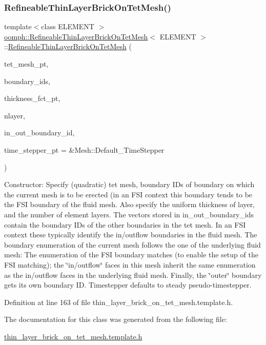 \subsubsection{\texorpdfstring{Refineable\+Thin\+Layer\+Brick\+On\+Tet\+Mesh()}{RefineableThinLayerBrickOnTetMesh()}}
{\footnotesize\ttfamily template$<$class E\+L\+E\+M\+E\+NT $>$ \\
\hyperlink{classoomph_1_1RefineableThinLayerBrickOnTetMesh}{oomph\+::\+Refineable\+Thin\+Layer\+Brick\+On\+Tet\+Mesh}$<$ E\+L\+E\+M\+E\+NT $>$\+::\hyperlink{classoomph_1_1RefineableThinLayerBrickOnTetMesh}{Refineable\+Thin\+Layer\+Brick\+On\+Tet\+Mesh} (\begin{DoxyParamCaption}\item[{Mesh $\ast$}]{tet\+\_\+mesh\+\_\+pt,  }\item[{const Vector$<$ unsigned $>$ \&}]{boundary\+\_\+ids,  }\item[{\hyperlink{classoomph_1_1RefineableThinLayerBrickOnTetMesh_a744583cb70486874441d5a748f23168d}{Thickness\+Fct\+Pt}}]{thickness\+\_\+fct\+\_\+pt,  }\item[{const unsigned \&}]{nlayer,  }\item[{const Vector$<$ Vector$<$ unsigned $>$ $>$ \&}]{in\+\_\+out\+\_\+boundary\+\_\+id,  }\item[{Time\+Stepper $\ast$}]{time\+\_\+stepper\+\_\+pt = {\ttfamily \&Mesh\+:\+:Default\+\_\+TimeStepper} }\end{DoxyParamCaption})\hspace{0.3cm}{\ttfamily [inline]}}



Constructor\+: Specify (quadratic) tet mesh, boundary I\+Ds of boundary on which the current mesh is to be erected (in an F\+SI context this boundary tends to be the F\+SI boundary of the fluid mesh. Also specify the uniform thickness of layer, and the number of element layers. The vectors stored in in\+\_\+out\+\_\+boundary\+\_\+ids contain the boundary I\+Ds of the other boundaries in the tet mesh. In an F\+SI context these typically identify the in/outflow boundaries in the fluid mesh. The boundary enumeration of the current mesh follows the one of the underlying fluid mesh\+: The enumeration of the F\+SI boundary matches (to enable the setup of the F\+SI matching); the \char`\"{}in/outflow\char`\"{} faces in this mesh inherit the same enumeration as the in/outflow faces in the underlying fluid mesh. Finally, the \char`\"{}outer\char`\"{} boundary gets its own boundary ID. Timestepper defaults to steady pseudo-\/timestepper. 



Definition at line 163 of file thin\+\_\+layer\+\_\+brick\+\_\+on\+\_\+tet\+\_\+mesh.\+template.\+h.



The documentation for this class was generated from the following file\+:\begin{DoxyCompactItemize}
\item 
\hyperlink{thin__layer__brick__on__tet__mesh_8template_8h}{thin\+\_\+layer\+\_\+brick\+\_\+on\+\_\+tet\+\_\+mesh.\+template.\+h}\end{DoxyCompactItemize}
